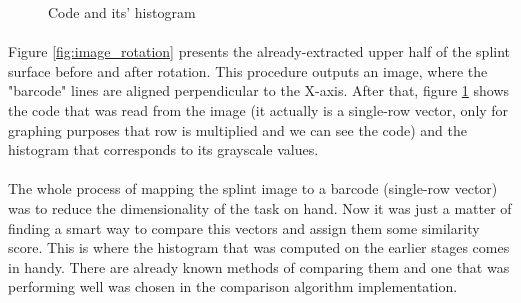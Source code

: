 \begin{figure}[H]
     \centering
     \vfill
     \caption{Code and its' histogram}
     \label{fig:code_with_histogram}
\end{figure}

\paragraph{}
Figure \ref{fig:image_rotation} presents the already-extracted upper half of the splint surface before and after rotation. This procedure outputs an image, where the "barcode" lines are aligned perpendicular to the X-axis. After that, figure \ref{fig:code_with_histogram} shows the code that was read from the image (it actually is a single-row vector, only for graphing purposes that row is multiplied and we can see the code) and the histogram that corresponds to its grayscale values.

\paragraph{}
The whole process of mapping the splint image to a barcode (single-row vector) was to reduce the dimensionality of the task on hand. Now it was just a matter of finding a smart way to compare this vectors and assign them some similarity score. This is where the histogram that was computed on the earlier stages comes in handy. There are already known methods of comparing them and one that was performing well was chosen in the comparison algorithm implementation.

